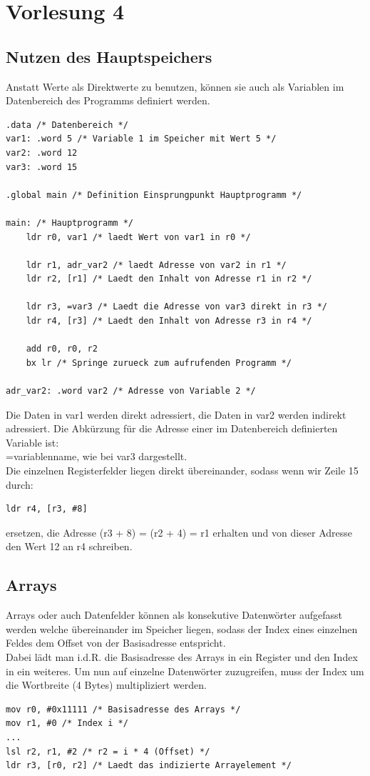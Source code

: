 \documentclass[a4paper,12pt,leqno]{article}
\begin{document}
\section{Vorlesung 4}

\subsection{Nutzen des Hauptspeichers}
Anstatt Werte als Direktwerte zu benutzen, können sie auch als Variablen im Datenbereich des Programms definiert werden.
\begin{lstlisting}
.data /* Datenbereich */
var1: .word 5 /* Variable 1 im Speicher mit Wert 5 */
var2: .word 12 
var3: .word 15

.global main /* Definition Einsprungpunkt Hauptprogramm */

main: /* Hauptprogramm */
	ldr r0, var1 /* laedt Wert von var1 in r0 */
	
	ldr r1, adr_var2 /* laedt Adresse von var2 in r1 */
	ldr r2, [r1] /* Laedt den Inhalt von Adresse r1 in r2 */

	ldr r3, =var3 /* Laedt die Adresse von var3 direkt in r3 */
	ldr r4, [r3] /* Laedt den Inhalt von Adresse r3 in r4 */
	
	add r0, r0, r2
	bx lr /* Springe zurueck zum aufrufenden Programm */

adr_var2: .word var2 /* Adresse von Variable 2 */
\end{lstlisting}
Die Daten in var1 werden direkt adressiert, die Daten in var2 werden indirekt adressiert. Die Abkürzung für die Adresse einer im Datenbereich definierten Variable ist:\\ =variablenname, wie bei var3 dargestellt.\\

Die einzelnen Registerfelder liegen direkt übereinander, sodass wenn wir Zeile 15 durch:
\begin{lstlisting}
ldr r4, [r3, #8]
\end{lstlisting}
ersetzen, die Adresse (r3 + 8) = (r2 + 4) = r1 erhalten und von dieser Adresse den Wert 12 an r4 schreiben.

\subsection{Arrays}
Arrays oder auch Datenfelder können als konsekutive Datenwörter aufgefasst werden welche übereinander im Speicher liegen, sodass der Index eines einzelnen Feldes dem Offset von der Basisadresse entspricht.\\
Dabei lädt man i.d.R. die Basisadresse des Arrays in ein Register und den Index in ein weiteres. Um nun auf einzelne Datenwörter zuzugreifen, muss der Index um die Wortbreite (4 Bytes) multipliziert werden.
\begin{lstlisting}
mov r0, #0x11111 /* Basisadresse des Arrays */
mov r1, #0 /* Index i */
...
lsl r2, r1, #2 /* r2 = i * 4 (Offset) */
ldr r3, [r0, r2] /* Laedt das indizierte Arrayelement */
\end{lstlisting}
\end{document}
